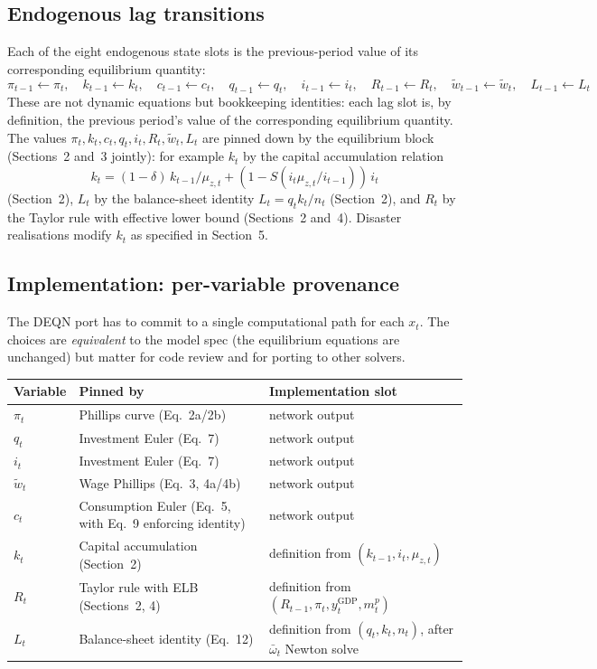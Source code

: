 \documentclass[11pt]{article}
\begin{document}
\subsection{Endogenous lag transitions}

Each of the eight endogenous state slots is the previous-period value of
its corresponding equilibrium quantity:
\begin{equation*}
  \pi_{t-1} \leftarrow \pi_t, \quad
  k_{t-1} \leftarrow k_t, \quad
  c_{t-1} \leftarrow c_t, \quad
  q_{t-1} \leftarrow q_t, \quad
  i_{t-1} \leftarrow i_t, \quad
  R_{t-1} \leftarrow R_t, \quad
  \tilde{w}_{t-1} \leftarrow \tilde{w}_t, \quad
  L_{t-1} \leftarrow L_t
\end{equation*}
These are not dynamic equations but bookkeeping identities: each lag slot
is, by definition, the previous period's value of the corresponding
equilibrium quantity. The values $\pi_t, k_t, c_t, q_t, i_t, R_t,
\tilde{w}_t, L_t$ are pinned down by the equilibrium block (Sections~2
and~3 jointly): for example $k_t$ by the capital accumulation relation
\[
  k_t = (1-\delta)\,k_{t-1}/\mu_{z,t} + (1 - S(i_t\mu_{z,t}/i_{t-1}))\,i_t
\]
(Section~2), $L_t$ by the balance-sheet identity $L_t = q_t k_t / n_t$
(Section~2), and $R_t$ by the Taylor rule with effective lower bound
(Sections~2 and~4). Disaster realisations modify $k_t$ as specified in
Section~5.

\subsection{Implementation: per-variable provenance}

The DEQN port has to commit to a single computational path for each
$x_t$. The choices are \emph{equivalent} to the model spec (the
equilibrium equations are unchanged) but matter for code review and for
porting to other solvers.

\begin{center}
\begin{tabular}{lll}
\toprule
Variable & Pinned by & Implementation slot \\
\midrule
$\pi_t$         & Phillips curve (Eq.~2a/2b) & network output \\
$q_t$           & Investment Euler (Eq.~7) & network output \\
$i_t$           & Investment Euler (Eq.~7) & network output \\
$\tilde{w}_t$   & Wage Phillips (Eq.~3, 4a/4b) & network output \\
$c_t$           & Consumption Euler (Eq.~5, with Eq.~9 enforcing identity) & network output \\
$k_t$           & Capital accumulation (Section~2) & definition from $(k_{t-1}, i_t, \mu_{z,t})$ \\
$R_t$           & Taylor rule with ELB (Sections~2, 4) & definition from $(R_{t-1}, \pi_t, y_t^{\text{GDP}}, m_t^p)$ \\
$L_t$           & Balance-sheet identity (Eq.~12) & definition from $(q_t, k_t, n_t)$, after $\bar\omega_t$ Newton solve \\
\bottomrule
\end{tabular}
\end{center}
\end{document}
